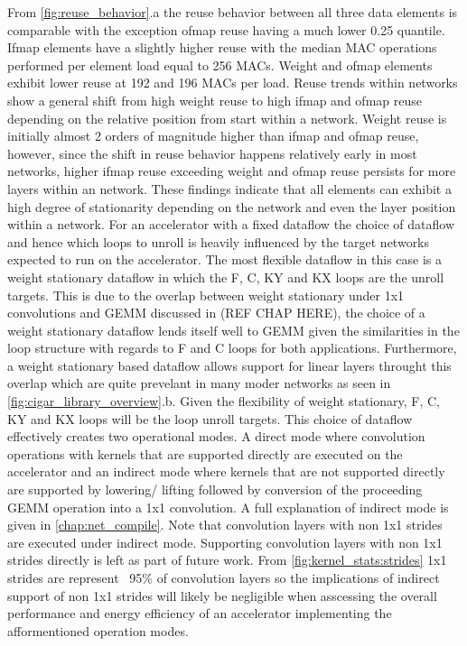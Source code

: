 From \autoref{fig:reuse_behavior}.a the reuse
behavior between all three data elements is comparable with the exception ofmap
reuse having a much lower 0.25 quantile. Ifmap elements have a slightly higher
reuse with the median MAC operations performed per element load equal to 256
MACs. Weight and ofmap elements exhibit lower reuse at 192 and 196 MACs per
load. Reuse trends within networks show a general shift from high weight reuse
to high ifmap and ofmap reuse depending on the relative position from start
within a network. Weight reuse is initially almost 2 orders of magnitude higher
than ifmap and ofmap reuse, however, since the shift in reuse behavior happens
relatively early in most networks, higher ifmap reuse exceeding weight and ofmap
reuse persists for more layers within an network. These findings indicate that
all elements can exhibit a high degree of stationarity depending on the network and
even the layer position within a network. For an accelerator with a fixed
dataflow the choice of dataflow and hence which loops to unroll is heavily
influenced by the target networks expected to run on the accelerator.
The most flexible dataflow in this case is a weight stationary dataflow in which
the F, C, KY and KX loops are the unroll targets. This is due to the overlap
between weight stationary under 1x1 convolutions and GEMM discussed in (REF CHAP HERE), the choice of a weight
stationary dataflow lends itself well to \ac{GEMM} given the similarities in the
loop structure with regards to F and C loops for both applications. Furthermore,
a weight stationary based dataflow allows support for linear layers throught
this overlap which are quite prevelant in many moder networks as seen in
\autoref{fig:cigar_library_overview}.b. Given the flexibility of weight
stationary, F, C, KY and KX loops will be the loop unroll targets. This choice
of dataflow effectively creates two operational modes. A direct mode where
convolution operations with kernels that are supported directly are executed on
the accelerator and an indirect mode where kernels that are not supported directly are supported by
lowering/ lifting followed by conversion of the proceeding GEMM operation into a
1x1 convolution. A full explanation of indirect mode is given in
\autoref{chap:net_compile}. Note that convolution layers with non 1x1 strides are executed
under indirect mode. Supporting convolution layers with non 1x1 strides directly
is left as part of future work. From \autoref{fig:kernel_stats:strides} 1x1
strides are represent ~95\% of convolution layers so the implications of
indirect support of non 1x1 strides will likely be negligible when asscessing
the overall performance and energy efficiency of an accelerator implementing the
afformentioned operation modes.

